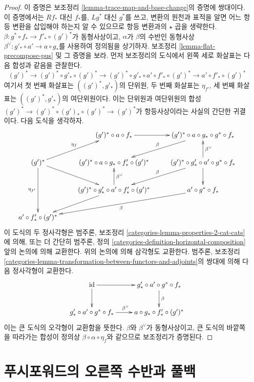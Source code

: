 \begin{proof}
이 증명은 보조정리 \ref{lemma-trace-map-and-base-change}의 증명에
쌍대이다. 이 증명에서는 $Rf_*$ 대신 $f_*$를, $Lg^*$ 대신 $g^*$를
쓰고,
변환의 원천과 표적을 알면 어느 항등 변환을 삽입해야 하는지 알 수
있으므로 항등 변환과의 $\star$ 곱을 생략한다.
$\beta : g^* \circ f_* \to f'_* \circ (g')^*$가 동형사상이고,
$\alpha$가 $\beta$의 수반인 동형사상
$\beta^\vee : g'_* \circ a' \to a \circ g_*$를 사용하여 정의됨을
상기하자. 보조정리 \ref{lemma-flat-precompose-pus} 및 그 증명을 보라.
먼저 보조정리의 도식에서 왼쪽 세로 화살표는 다음 합성과 같음을
관찰한다.
$$
(g')^* \to (g')^* \circ g'_* \circ (g')^* \to
(g')^* \circ g'_* \circ a' \circ f'_* \circ (g')^* \to
a' \circ f'_* \circ (g')^*
$$
여기서 첫 번째 화살표는 $((g')^*, g'_*)$의 단위원, 두 번째 화살표는
$\eta_{f'}$, 세 번째 화살표는 $((g')^*, g'_*)$의 여단위원이다.
이는 단위원과 여단위원의 합성
$(g')^* \to (g')^* \circ (g')_* \circ (g')^* \to (g')^*$가
항등사상이라는 사실의 간단한 귀결이다. 다음 도식을 생각하자.
$$
\xymatrix{
& (g')^* \circ a \circ f_* \ar[r] &
(g')^* \circ a \circ g_* \circ g^* \circ f_*
\ar[ld]_\beta \\
(g')^* \ar[ru]^{\eta_f} \ar[dd]_{\eta_{f'}} \ar[rd] &
(g')^* \circ a \circ g_* \circ f'_* \circ (g')^* &
(g')^* \circ g'_* \circ a' \circ g^* \circ f_*
\ar[u]_{\beta^\vee} \ar[ld]_\beta \ar[d] \\
& (g')^* \circ g'_* \circ a' \circ f'_* \circ (g')^*
\ar[ld] \ar[u]_{\beta^\vee} &
a' \circ g^* \circ f_* \ar[lld]^\beta \\
a' \circ f'_* \circ (g')^*
}
$$
이 도식의 두 정사각형은 범주론, 보조정리
\ref{categories-lemma-properties-2-cat-cats}에 의해, 또는 더 간단히
범주론, 정의 \ref{categories-definition-horizontal-composition} 앞의
논의에 의해 교환한다. 위의 논의에 의해 삼각형도 교환한다.
범주론, 보조정리
\ref{categories-lemma-transformation-between-functors-and-adjoints}의
쌍대에 의해 다음 정사각형이 교환한다.
$$
\xymatrix{
\text{id} \ar[r] \ar[d] &
g'_* \circ a' \circ g^* \circ f_* \ar[d]^\beta \\
g'_* \circ a' \circ g^* \circ f_* \ar[r]^{\beta^\vee} &
a \circ g_* \circ f'_* \circ (g')^*
}
$$
이는 큰 도식의 오각형이 교환함을 뜻한다. $\beta$와 $\beta^\vee$가
동형사상이고, 큰 도식의 바깥쪽을 따라가는 합성이 정의상
$\beta \circ \alpha \circ \eta_f$와 같으므로 보조정리가 증명된다.
\end{proof}
\section{푸시포워드의 오른쪽 수반과 풀백}
\label{section-compare-with-pullback}

